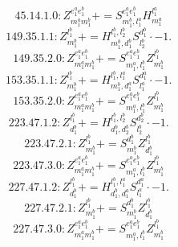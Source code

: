\documentclass[letterpaper,10pt,fleqn,leqno,onecolumn]{article}
\begin{document}
\begin{equation} \;\;\;\;\;\;  45.14.1.0: Z^{e_{1}^{a}e_{1}^{b}}_{m_{1}^{a}m_{1}^{b}}+=S^{e_{1}^{a}e_{1}^{b}}_{m_{1}^{b},l_{1}^{a}}H^{l_{1}^{a}}_{m_{1}^{a}} \end{equation}
\begin{equation} \;\;\;\;\;\;  149.35.1.1: Z^{l_{1}^{b}}_{m_{1}^{b}}+=H^{l_{1}^{b},l_{2}^{b}}_{m_{1}^{b},d_{1}^{b}}S^{d_{1}^{b}}_{l_{2}^{b}}\cdot -1. \end{equation}
\begin{equation} \;\;\;\;\;\;  149.35.2.0: Z^{e_{1}^{a}e_{1}^{b}}_{m_{1}^{a}m_{1}^{b}}+=S^{e_{1}^{a}e_{1}^{b}}_{m_{1}^{a},l_{1}^{b}}Z^{l_{1}^{b}}_{m_{1}^{b}} \end{equation}
\begin{equation} \;\;\;\;\;\;  153.35.1.1: Z^{l_{1}^{b}}_{m_{1}^{b}}+=H^{l_{1}^{b},l_{1}^{a}}_{m_{1}^{b},d_{1}^{a}}S^{d_{1}^{a}}_{l_{1}^{a}}\cdot -1. \end{equation}
\begin{equation} \;\;\;\;\;\;  153.35.2.0: Z^{e_{1}^{a}e_{1}^{b}}_{m_{1}^{a}m_{1}^{b}}+=S^{e_{1}^{a}e_{1}^{b}}_{m_{1}^{a},l_{1}^{b}}Z^{l_{1}^{b}}_{m_{1}^{b}} \end{equation}
\begin{equation} \;\;\;\;\;\;  223.47.1.2: Z^{l_{1}^{b}}_{d_{1}^{b}}+=H^{l_{1}^{b},l_{2}^{b}}_{d_{1}^{b},d_{2}^{b}}S^{d_{2}^{b}}_{l_{2}^{b}}\cdot -1. \end{equation}
\begin{equation} \;\;\;\;\;\;  223.47.2.1: Z^{l_{1}^{b}}_{m_{1}^{b}}+=S^{d_{1}^{b}}_{m_{1}^{b}}Z^{l_{1}^{b}}_{d_{1}^{b}} \end{equation}
\begin{equation} \;\;\;\;\;\;  223.47.3.0: Z^{e_{1}^{a}e_{1}^{b}}_{m_{1}^{a}m_{1}^{b}}+=S^{e_{1}^{a}e_{1}^{b}}_{m_{1}^{a},l_{1}^{b}}Z^{l_{1}^{b}}_{m_{1}^{b}} \end{equation}
\begin{equation} \;\;\;\;\;\;  227.47.1.2: Z^{l_{1}^{b}}_{d_{1}^{b}}+=H^{l_{1}^{b},l_{1}^{a}}_{d_{1}^{b},d_{1}^{a}}S^{d_{1}^{a}}_{l_{1}^{a}}\cdot -1. \end{equation}
\begin{equation} \;\;\;\;\;\;  227.47.2.1: Z^{l_{1}^{b}}_{m_{1}^{b}}+=S^{d_{1}^{b}}_{m_{1}^{b}}Z^{l_{1}^{b}}_{d_{1}^{b}} \end{equation}
\begin{equation} \;\;\;\;\;\;  227.47.3.0: Z^{e_{1}^{a}e_{1}^{b}}_{m_{1}^{a}m_{1}^{b}}+=S^{e_{1}^{a}e_{1}^{b}}_{m_{1}^{a},l_{1}^{b}}Z^{l_{1}^{b}}_{m_{1}^{b}} \end{equation}
\end{document}
